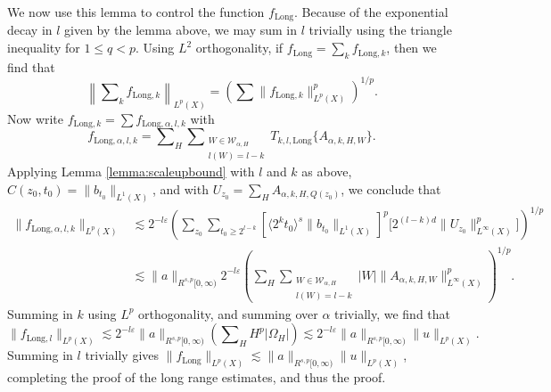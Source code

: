 We now use this lemma to control the function $f_{\text{Long}}$. Because of the exponential decay in $l$ given by the lemma above, we may sum in $l$ trivially using the triangle inequality for $1 \leq q < p$. Using $L^2$ orthogonality, if $f_{\text{Long}} = \sum_k f_{\text{Long},k}$, then we find that
%
\begin{equation}
    \left\| \sum\nolimits_k f_{\text{Long},k} \right\|_{L^p(X)} = \left( \sum \| f_{\text{Long},k} \|_{L^p(X)}^p \right)^{1/p}.
\end{equation}
%
Now write $f_{\text{Long},k} = \sum f_{\text{Long},\alpha,l,k}$ with
%
\begin{equation}
    f_{\text{Long},\alpha,l,k} = \sum\nolimits_H \sum\nolimits_{\substack{W \in \mathcal{W}_{\alpha,H}\\l(W) = l - k}} T_{k,l,\text{Long}} \{ A_{\alpha,k,H,W} \}.
\end{equation}
%
Applying Lemma \ref{lemma:scaleupbound} with $l$ and $k$ as above, $C(z_0,t_0) =  \| b_{t_0} \|_{L^1(X)}$, and with $U_{z_0} = \sum\nolimits_H A_{\alpha,k,H,Q(z_0)}$, we conclude that %
\begin{equation}
\begin{split}
    \| f_{\text{Long},\alpha,l,k} \|_{L^p(X)} &\lesssim 2^{-l \varepsilon} \left( \sum\nolimits_{z_0} \sum\nolimits_{t_0 \geq 2^{l-k}} [ \langle 2^k t_0 \rangle^{s} \| b_{t_0} \|_{L^1(X)} ]^p \big[ 2^{(l-k)d} \| U_{z_0} \|_{L^\infty(X)}^p \big] \right)^{1/p}\\
    &\lesssim \| a \|_{R^{s,p}[0,\infty)} 2^{-l \varepsilon} \left(  \sum\nolimits_H \sum\nolimits_{\substack{W \in \mathcal{W}_{\alpha,H}\\l(W) = l-k}} |W| \| A_{\alpha,k,H,W} \|_{L^\infty(X)}^p \right)^{1/p}.
\end{split}
\end{equation}
Summing in $k$ using $L^p$ orthogonality, and summing over $\alpha$ trivially, we find that
%
\begin{equation}
    \| f_{\text{Long},l} \|_{L^p(X)} \lesssim 2^{-l \varepsilon}  \| a \|_{R^{s,p}[0,\infty)} \left( \sum\nolimits_H H^p |\Omega_H| \right) \lesssim 2^{-l \varepsilon}  \| a \|_{R^{s,p}[0,\infty)} \| u \|_{L^p(X)}. 
\end{equation}
%
Summing in $l$ trivially gives $\| f_{\text{Long}} \|_{L^p(X)} \lesssim \| a \|_{R^{s,p}[0,\infty)} \| u \|_{L^p(X)}$, completing the proof of the long range estimates, and thus the proof.

